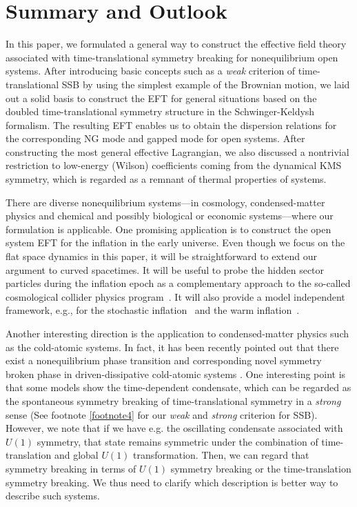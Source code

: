 \documentclass[a4paper,11pt]{article}
\begin{document}
\section{Summary and Outlook}
\label{section:Summary}

In this paper, we formulated a general way to construct the effective field 
theory associated with time-translational symmetry breaking for 
nonequilibrium open systems. 
After introducing basic concepts such as a \textit{weak} criterion of 
time-translational SSB by using the simplest example of the Brownian motion, 
we laid out a solid basis to construct the EFT for general situations
based on the doubled time-translational symmetry structure 
in the Schwinger-Keldysh formalism. 
The resulting EFT enables us to obtain the dispersion relations for the corresponding NG mode 
and gapped mode for open systems.
After constructing the most general effective Lagrangian, 
we also discussed a nontrivial restriction to low-energy (Wilson) coefficients 
coming from the dynamical KMS symmetry, 
which is regarded as a remnant of thermal properties of systems. 

\medskip
There are diverse nonequilibrium systems---in cosmology, 
condensed-matter physics and chemical and possibly biological or economic systems---where 
our formulation is applicable.
One promising application is to construct 
the open system EFT for the inflation in the early universe. 
Even though we focus on the flat space dynamics in this paper, 
it will be straightforward to extend our argument to curved spacetimes.
It will be useful to probe the hidden sector particles during the inflation epoch as a complementary approach to the so-called cosmological collider physics program~\cite{Chen:2009zp,Baumann:2011nk,Noumi:2012vr,Arkani-Hamed:2015bza}. It will also provide a model independent framework, e.g., for the stochastic inflation~\cite{stochastic} and the warm inflation~\cite{Berera:1995ie}.

\medskip
Another interesting direction is the application to condensed-matter physics
such as the cold-atomic systems. 
In fact, it has been recently pointed out that there exist 
a nonequilibrium phase transition and corresponding novel symmetry broken 
phase in driven-dissipative cold-atomic systems \cite{PhysRevLett.96.230602,PhysRevLett.99.140402,sieberer2016keldysh}. 
One interesting point is that some models show 
the time-dependent condensate, which can be regarded 
as the spontaneous symmetry breaking of time-translational symmetry 
in a \textit{strong} sense (See footnote \ref{footnote4} for our 
\textit{weak} and \textit{strong} criterion for SSB). 
However, we note that if we have e.g. the oscillating condensate 
associated with $U(1)$ symmetry, 
that state remains symmetric under the combination of 
time-translation and global $U(1)$ transformation.
Then, we can regard that symmetry breaking in terms of $U(1)$ symmetry breaking 
or the time-translation symmetry breaking. 
We thus need to clarify which description is better way 
to describe such systems.
\end{document}
